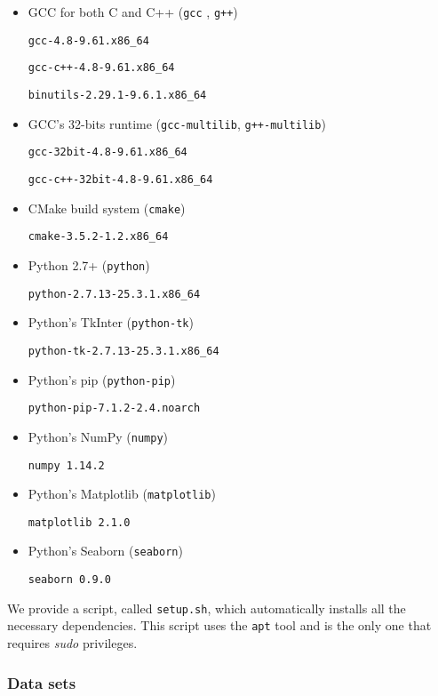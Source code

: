 {\begin{itemize}
  \item GCC for both C and C++ (\texttt{gcc} , \texttt{g++})

\texttt{gcc-4.8-9.61.x86\_64}

\texttt{gcc-c++-4.8-9.61.x86\_64}

\texttt{binutils-2.29.1-9.6.1.x86\_64}

  \item GCC's 32-bits runtime (\texttt{gcc-multilib}, \texttt{g++-multilib})

\texttt{gcc-32bit-4.8-9.61.x86\_64}

\texttt{gcc-c++-32bit-4.8-9.61.x86\_64}

  \item CMake build system (\texttt{cmake})

\texttt{cmake-3.5.2-1.2.x86\_64}

  \item Python 2.7+ (\texttt{python})

\texttt{python-2.7.13-25.3.1.x86\_64}

  \item Python's TkInter (\texttt{python-tk})

\texttt{python-tk-2.7.13-25.3.1.x86\_64}

  \item Python's pip (\texttt{python-pip})

\texttt{python-pip-7.1.2-2.4.noarch}

  \item Python's NumPy (\texttt{numpy})

\texttt{numpy 1.14.2}

  \item Python's Matplotlib (\texttt{matplotlib})

\texttt{matplotlib 2.1.0}

  \item Python's Seaborn (\texttt{seaborn})

\texttt{seaborn 0.9.0}

\end{itemize}

We provide a script, called \texttt{setup.sh}, which automatically installs
all the necessary dependencies. This script uses the \texttt{apt} tool and is the only one that requires \textit{sudo} privileges.

\subsubsection{Data sets}

}
